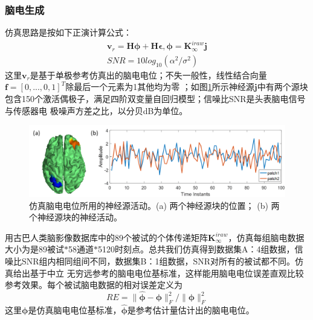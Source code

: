 \subsubsection{脑电生成}
仿真思路是按如下正演计算公式：
\begin{equation}\label{eq3.18}
\begin{aligned}
\mathbf{v}_r=\mathbf{H\phi}+\mathbf{H\epsilon},\mathbf{\phi}=\mathbf{K}_{\infty}^{iraw}\mathbf{j}\\
SNR=10log_{10}(\alpha^2/\sigma^2)
\end{aligned}
\end{equation}
这里$\mathbf{v}_r$是基于单极参考仿真出的脑电电位；不失一般性，线性结合向量$\mathbf{f}=[0,...,0,1]^T$除最后一个元素为1其他均为零
；如图\ref{3:3}所示神经源$\mathbf{j}$中有两个源块包含150个激活偶极子，满足四阶双变量自回归模型；信噪比SNR是头表脑电信号与传感器电
极噪声方差之比，以分贝dB为单位。
\begin{figure}[!h]
	\centering
	\includegraphics[width=15cm]{pic/Frontier/figure3.png}
	\caption{仿真脑电电位所用的神经源活动。(a) 两个神经源块的位置； (b) 两个神经源块的神经活动。}
	\label{3:3}
\end{figure}
用古巴人类脑影像数据库中的89个被试的个体传递矩阵$\mathbf{K}_{\infty}^{iraw}$，仿真每组脑电数据大小为是89被试$\ast$58通道$\ast$5120时刻点。总共我们仿真得到数据集A：4组数据，信噪比SNR组内相同组间不同，数据集B：1组数据，SNR对所有的被试都不同。仿真给出基于中立
无穷远参考的脑电电位基标准，这样能用脑电电位误差直观比较参考效果。每个被试脑电数据的相对误差定义为
\begin{equation}\label{eq3.19}
RE=\lVert\hat{\mathbf{\phi}}-\mathbf{\phi}\rVert^2_F/{\lVert\mathbf{\phi}\rVert^2_F}
\end{equation}
这里$\mathbf{\phi}$是仿真脑电电位基标准，$\hat{\mathbf{\phi}}$是参考估计量估计出的脑电电位。

